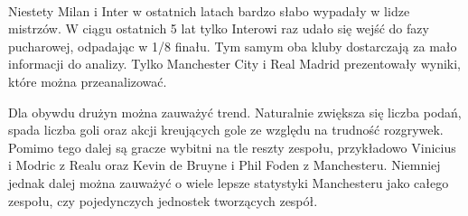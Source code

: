 \documentclass[12pt, letterpaper]{article}
\begin{document}
\paragraph{} Niestety Milan i Inter w ostatnich latach bardzo słabo wypadały w lidze mistrzów. W ciągu ostatnich 5 lat tylko Interowi raz udało się wejść do fazy pucharowej, odpadając w 1/8 finału. Tym samym oba kluby dostarczają za mało informacji do analizy. Tylko Manchester City i Real Madrid prezentowały wyniki, które można przeanalizować.
\par Dla obywdu drużyn można zauważyć trend. Naturalnie zwiększa się liczba podań, spada liczba goli oraz akcji kreujących gole ze względu na trudność rozgrywek. Pomimo tego dalej są gracze wybitni na tle reszty zespołu, przykładowo Vinicius i Modric z Realu oraz Kevin de Bruyne i Phil Foden z Manchesteru. Niemniej jednak dalej można zauważyć o wiele lepsze statystyki Manchesteru jako całego zespołu, czy pojedynczych jednostek tworzących zespół.
\pagebreak
\end{document}
